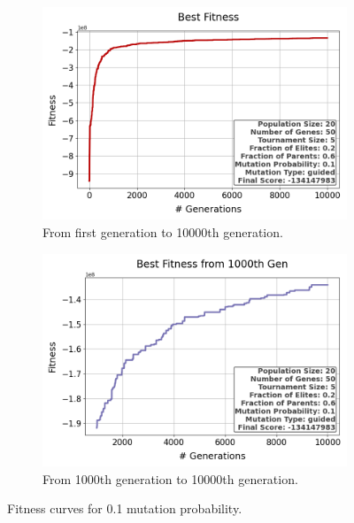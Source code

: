 \documentclass{assignment}
\begin{document}
\begin{figure}[H]
    \begin{subfigure}{0.5\textwidth}
        \includegraphics[width=\textwidth]{figures/best_fitness_output_20_50_5_0.2_0.6_0.1_guided.png}
        \caption{From first generation to 10000th generation.}
    \end{subfigure}\hfill
    \begin{subfigure}{0.5\textwidth}
        \includegraphics[width=\textwidth]{figures/best_fitness_1000_output_20_50_5_0.2_0.6_0.1_guided.png}
        \caption{From 1000th generation to 10000th generation.}
    \end{subfigure}
    \caption{Fitness curves for 0.1 mutation probability.}
\label{fig:0.1mutation}
\end{figure}
\end{document}
